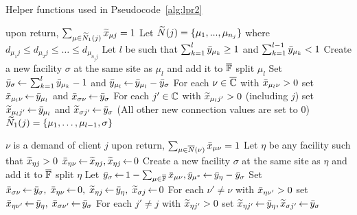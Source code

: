 \documentclass[11pt]{article}
\begin{document}
\begin{algorithm}[ht]
  \caption{Helper functions used in Pseudocode~\ref{alg:lpr2}}
  \label{alg:helper}
  \begin{algorithmic}[1]
						\Comment upon return, $\sum_{\mu\in{\widetilde N}_1(j)} {\widetilde x}_{\mu j} = 1$
    \State Let ${\widetilde N}(j) = \{\mu_1,...,\mu_{n_j}\}$ where $d_{\mu_1 j} \leq d_{\mu_2 j} \leq \ldots \leq d_{\mu_{n_j j}}$
    \State Let $l$ be such that $\sum_{k=1}^{l} {\bar y}_{\mu_k} \geq 1$ and $\sum_{k=1}^{l -1} {\bar y}_{\mu_{k}} < 1$
    \State Create a new facility $\sigma$ at the same site as $\mu_l$ and add it to $\overline{\mathbb{F}}$
			\Comment split $\mu_l$
    \State Set ${\bar y}_{\sigma}{\,\leftarrow\,} \sum_{k=1}^{l} {\bar y}_{\mu_{k}}-1$
					and ${\bar y}_{\mu_l} {\,\leftarrow\,} {\bar y}_{\mu_l} - {\bar y}_{\sigma}$
    \State For each $\nu\in\overline{\mathbb{C}}$ with ${\bar x}_{\mu_{l}\nu}>0$
 			set ${\bar x}_{\mu_{l}\nu} {\,\leftarrow\,} {\bar y}_{\mu_l}$ and ${\bar x}_{\sigma \nu} {\,\leftarrow\,} {\bar y}_{\sigma}$
    \State For each $j'\in\mathbb{C}$ with ${\widetilde x}_{\mu_{l} j'}>0$ (including $j$)
			set ${\widetilde x}_{\mu_l j'} {\,\leftarrow\,} {\bar y}_{\mu_l}$ and ${\widetilde x}_{\sigma j'} {\,\leftarrow\,} {\bar y}_\sigma$
	\State (All other new connection values are set to $0$)
    \State \Return ${\widetilde N}_1(j) = \{\mu_{1},\ldots,\mu_{l-1}, \sigma\}$    				
    \EndFunction

    					\Comment $\nu$ is a demand of client $j$
    					\Comment upon return, $\sum_{\mu\in{\overline{N}}(\nu)} {\bar x}_{\mu\nu} = 1$
    \State Let $\eta$ be any facility such that ${\widetilde x}_{\eta j} > 0$
    \State ${\bar x}_{\eta\nu} {\,\leftarrow\,} {\widetilde x}_{\eta j}, {\widetilde x}_{\eta j} {\,\leftarrow\,} 0$
    \Else
    \State Create a new facility $\sigma$ at the same site as $\eta$ and add it to $\overline{\mathbb{F}}$
    					\Comment split $\eta$
    \State Let ${\bar y}_\sigma {\,\leftarrow\,} 1-\sum_{\mu\in \overline{\mathbb{F}}} {\bar x}_{\mu\nu}, {\bar y}_{\mu^\ast} {\,\leftarrow\,} {\bar y}_{\eta} - {\bar y}_{\sigma}$
    \State Set ${\bar x}_{\sigma\nu}{\,\leftarrow\,} {\bar y}_{\sigma},\; {\bar x}_{\eta \nu} {\,\leftarrow\,}  0,\; {\widetilde x}_{\eta j} {\,\leftarrow\,} {\bar y}_{\eta}, \; {\widetilde x}_{\sigma j} {\,\leftarrow\,} 0$
    \State For each $\nu' \neq \nu$ with ${\bar x}_{\eta \nu'}>0$ set ${\bar x}_{\eta \nu'} {\,\leftarrow\,} {\bar y}_{\eta},\; {\bar x}_{\sigma \nu'} {\,\leftarrow\,} {\bar y}_{\sigma}$
    \State For each $j' \neq j$ with ${\widetilde x}_{\eta j'}>0$ set ${\widetilde x}_{\eta j'} {\,\leftarrow\,} {\bar y}_{\eta}, {\widetilde x}_{\sigma j'} {\,\leftarrow\,} {\bar y}_{\sigma}$
    \EndIf
    \EndWhile
    \EndFunction
  \end{algorithmic}
\end{algorithm}
\end{document}
